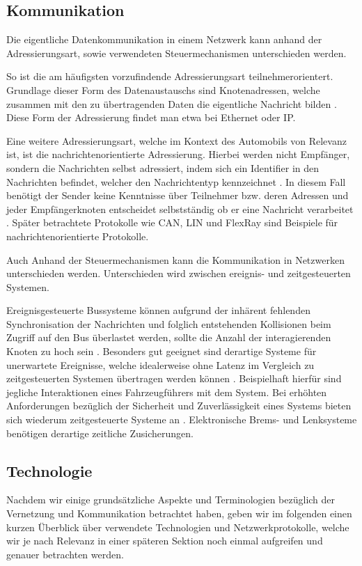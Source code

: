     \subsection{Kommunikation}
    Die eigentliche Datenkommunikation in einem Netzwerk kann anhand der Adressierungsart, sowie verwendeten Steuermechanismen unterschieden werden. 

    So ist die am häufigsten vorzufindende Adressierungsart teilnehmerorientert. Grundlage dieser Form des Datenaustauschs sind Knotenadressen, welche zusammen mit den
    zu übertragenden Daten die eigentliche Nachricht bilden \cite{reif2011bosch}. Diese Form der Adressierung findet man etwa bei Ethernet oder IP. 

    Eine weitere Adressierungsart, welche im Kontext des Automobils von Relevanz ist, ist die nachrichtenorientierte Adressierung. Hierbei werden nicht Empfänger, sondern die Nachrichten selbst
    adressiert, indem sich ein Identifier in den Nachrichten befindet, welcher den Nachrichtentyp kennzeichnet \cite{reif2011bosch}. In diesem Fall benötigt der Sender keine 
    Kenntnisse über Teilnehmer bzw. deren Adressen und jeder Empfängerknoten entscheidet selbstständig ob er eine Nachricht verarbeitet \cite{reif2011bosch}. Später betrachtete
    Protokolle wie CAN, LIN und FlexRay sind Beispiele für nachrichtenorientierte Protokolle.

    Auch Anhand der Steuermechanismen kann die Kommunikation in Netzwerken unterschieden werden. Unterschieden wird zwischen ereignis- und zeitgesteuerten Systemen.

    Ereignisgesteuerte Bussysteme können aufgrund der inhärent fehlenden Synchronisation der Nachrichten und folglich entstehenden Kollisionen beim Zugriff auf den Bus
    überlastet werden, sollte die Anzahl der interagierenden Knoten zu hoch sein \cite{reif2011bosch}. Besonders gut geeignet sind derartige Systeme für unerwartete Ereignisse,
    welche idealerweise ohne Latenz im Vergleich zu zeitgesteuerten Systemen übertragen werden können \cite{reif2011bosch}. Beispielhaft hierfür sind jegliche Interaktionen eines 
    Fahrzeugführers mit dem System. Bei erhöhten Anforderungen bezüglich der Sicherheit und Zuverlässigkeit eines Systems bieten sich wiederum zeitgesteuerte Systeme an \cite{reif2011bosch}.
    Elektronische Brems- und Lenksysteme benötigen derartige zeitliche Zusicherungen.
    \subsection{Technologie}
    Nachdem wir einige grundsätzliche Aspekte und Terminologien bezüglich der Vernetzung und Kommunikation betrachtet haben, geben wir im folgenden einen kurzen Überblick
    über verwendete Technologien und Netzwerkprotokolle, welche wir je nach Relevanz in einer späteren Sektion noch einmal aufgreifen und genauer betrachten werden.
